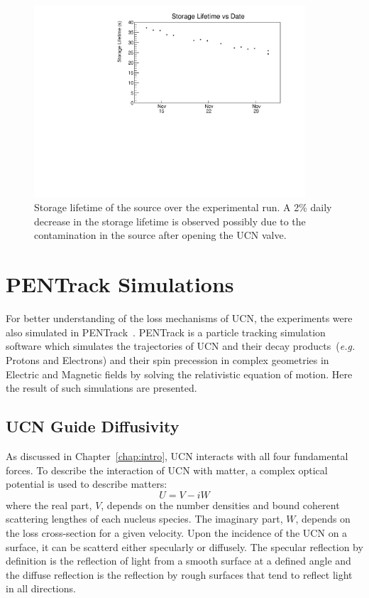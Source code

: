 \begin{figure}[h!]
  \centering
  \includegraphics[width=0.9\textwidth]{storageLifetime_vs_time.pdf}
  \caption{Storage lifetime of the source over the experimental run. A
    2\% daily decrease in the storage lifetime is observed possibly
    due to the contamination in the source after opening the UCN
    valve.}
  \label{fig:storagelifetime_overall}
\end{figure}



\section{PENTrack Simulations\label{sec:pentrack}}

For better understanding of the loss mechanisms of UCN, the
experiments were also simulated in
PENTrack~\cite{schreyer2017pentrack}. PENTrack is a particle tracking
simulation software which simulates the trajectories of UCN and their
decay products~({\it{e.g.}} Protons and Electrons) and their spin
precession in complex geometries in Electric and Magnetic fields by
solving the relativistic equation of motion. Here the result of such
simulations are presented.

\subsection{UCN Guide Diffusivity\label{sec:diffusivity}}
As discussed in Chapter~\ref{chap:intro}, UCN interacts with all four
fundamental forces. To describe the interaction of UCN with matter, a
complex optical potential is used to describe matters:
\begin{equation}
  \label{eqn:fermipotential}
  U = V - iW
\end{equation}
where the real part, $V$, depends on the number densities and bound
coherent scattering lengthes of each nucleus species. The imaginary
part, $W$, depends on the loss cross-section for a given velocity.
Upon the incidence of the UCN on a surface, it can be scatterd either
specularly or diffusely. The specular reflection by definition is the
reflection of light from a smooth surface at a defined angle and the
diffuse reflection is the reflection by rough surfaces that tend to
reflect light in all directions.

